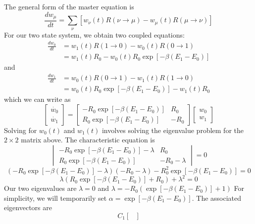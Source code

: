 \documentclass{article}
\begin{document}
\begin{itemize}
{\color{red} The general form of the master equation is
$$\frac{dw_{\mu}}{dt} = \sum_{\nu}[w_{\nu}(t)R(\nu \rightarrow \mu)
                              - w_{\mu}(t)R(\mu \rightarrow \nu)]
$$
For our two state system, we obtain two coupled equations:
\begin{equation}
\begin{aligned}
\frac{dw_{0}}{dt} &= w_{1}(t)R(1 \rightarrow 0)
                              - w_{0}(t)R(0 \rightarrow 1)\\
                  &= w_{1}(t)R_{0} - w_{0}(t)R_{0}\exp[-\beta (E_{1} - E_{0})]
\end{aligned}
\end{equation}
and
\begin{equation}
\begin{aligned}
\frac{dw_{1}}{dt} &= w_{0}(t)R(0 \rightarrow 1)
                              - w_{1}(t)R(1 \rightarrow 0)\\
                  &= w_{0}(t)R_{0}\exp[-\beta (E_{1} - E_{0})] - w_{1}(t)R_{0}
\end{aligned}
\end{equation}
which we can write as
$$
\begin{bmatrix}
\dot{w_{0}}
\\
\dot{w_{1}}
\end{bmatrix}
=
\begin{bmatrix}
-R_{0}\exp[-\beta (E_{1} - E_{0})] & R_{0}\\
 R_{0}\exp[-\beta (E_{1} - E_{0})] & -R_{0}
\end{bmatrix}
\begin{bmatrix}
w_{0}
\\
w_{1}
\end{bmatrix}
$$
Solving for $w_{0}(t)$ and $w_{1}(t)$ involves solving the eigenvalue problem for the $2\times2$
matrix above. The characteristic equation is
$$\begin{vmatrix}
-R_{0}\exp[-\beta (E_{1} - E_{0})] - \lambda & R_{0}\\
 R_{0}\exp[-\beta (E_{1} - E_{0})] & -R_{0} - \lambda
\end{vmatrix} = 0$$
$$(-R_{0}\exp[-\beta (E_{1} - E_{0})] - \lambda)(-R_{0} - \lambda) - R_{0}^{2}\exp[-\beta (E_{1} - E_{0})] = 0$$
$$\lambda(R_{0}\exp[-\beta (E_{1} - E_{0})] + R_{0}) + \lambda^{2} = 0 $$
Our two eigenvalues are $\lambda = 0$ and $\lambda = -R_{0}(\exp[-\beta (E_{1} - E_{0})] + 1)$
For simplicity, we will temporarily set $\alpha = \exp[-\beta (E_{1} - E_{0})]$. The associated eigenvectors are
$$C_{1}\begin{bmatrix}

\end{bmatrix}$$}
\end{itemize}
\end{document}
